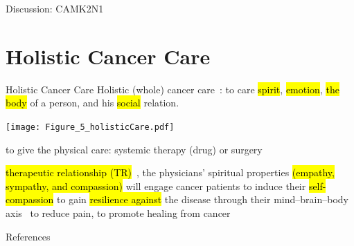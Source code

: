 \documentclass[paperwidth=78cm,paperheight=110cm,portrait]{baposter}
\begin{document}
\begin{poster}
\begin{posterbox}[name=problems,column=2,below=install]{Discussion: CAMK2N1}
\end{posterbox}



\section{Holistic Cancer Care}
\begin{posterbox}[name=feedback,column=2,below=problems]{Holistic Cancer Care}
Holistic (whole) cancer care~\cite{Mehta2019,Iftikhar2021}: to care \hl{spirit}, \hl{emotion}, \hl{the body} of a person, and his \hl{social} relation.

\begin{center}
  \texttt{[image: Figure\_5\_holisticCare.pdf]}
\end{center}

 
\begin{outline}
\1 to give the physical care: systemic therapy (drug) or surgery

\1 \hl{therapeutic relationship (TR)}~\cite{Rogers1979}, the physicians' spiritual properties \hl{(empathy, sympathy, and compassion)} will engage cancer patients
\1 to induce their \hl{self-compassion} to gain \hl{resilience against} the disease through their mind--brain--body axis~\cite{Hsiao2012}
\1 to reduce pain, to promote healing from cancer

\end{outline}

\end{posterbox}



\begin{posterbox}[name=refs,column=2,below=feedback,above=bottom]{References}








%  
%   
\end{posterbox}

\end{poster}
\end{document}
